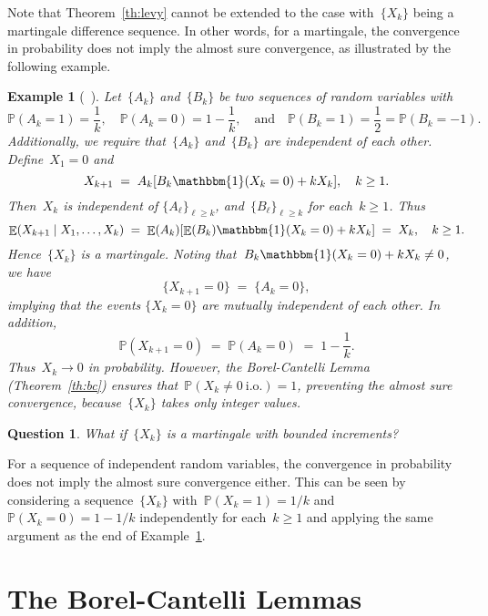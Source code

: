 \documentclass[12pt,a4paper]{article}  %
\newcounter{cite}
\newtheorem{example}{Example}[section]
\newtheorem{question}{Question}[section]
\theoremstyle{definition}
\numberwithin{equation}{section}
\newcommand{\ind}{\mathbbm{1}}
\newcommand{\io}{{\text{i.o.}}\xspace}
\newcommand{\iid}{{\text{i.i.d.}}\xspace}
\DeclareMathOperator{\expc}{\mathbb{E}}
\renewcommand{\Pr}{\mathbb{P}}
\begin{document}
Note that Theorem~\ref{th:levy} cannot be extended to the case with~$\{X_k\}$ being a martingale
difference sequence. In other words, for a martingale, the convergence in probability does not imply
the almost sure convergence, as illustrated by the following example.

\begin{example}[\mbox{~\cite[Example 4.2.14]{Durrett_2019}}]
    \label{exp:durret}
    Let~$\{A_k\}$ and~$\{B_k\}$ be two sequences of \iid random variables with
    \[
        \Pr(A_k = 1) = \frac{1}{k}, \quad \Pr(A_k = 0) = 1-\frac{1}{k},
        \quad \text{and} \quad
        \Pr(B_k=1) = \frac{1}{2} = \Pr(B_k = -1).
    \]
    Additionally, we require that~$\{A_k\}$ and~$\{B_k\}$ are independent of each other.
    Define~$X_1 = 0$ and
    \[
        X_{k+1} \;=\;  A_k[B_k \ind(X_k=0) + k X_k], \quad k \ge 1.
    \]
    Then~$X_k$ is independent of $\{A_\ell\}_{\ell \ge k}$, and~$\{B_\ell\}_{\ell\ge k}$  for
    each~$k\ge 1$. Thus
    \[
        \expc(X_{k+1} \mathrel{|} X_1, \ldots, X_k)
        \;=\;
        \expc(A_k) [\expc(B_k) \ind(X_k=0) + k X_k]
        \;=\; X_k, \quad k \ge 1.
    \]
    Hence~$\{X_k\}$ is a martingale. Noting that~$B_k \ind(X_k=0) + k X_k \neq 0$, we have
    \[
        \{X_{k+1} =0\} \;=\; \{A_k = 0\},
    \]
    implying that the events $\{X_k = 0\}$ are mutually
    independent of each other. In addition,
    \[
        \Pr(X_{k+1} = 0) \;=\; \Pr(A_k = 0) \;=\;  1-\frac{1}{k}.
    \]
    Thus~$X_k \to 0$ in probability. However, the Borel-Cantelli Lemma
    \textnormal{(}Theorem~\ref{th:bc}\textnormal{)}
    ensures that~$\Pr(X_k \neq 0~\io) = 1$, preventing the almost sure convergence,
    because~$\{X_k\}$ takes only integer values.
\end{example}

\begin{question}
    What if~$\{X_k\}$ is a martingale with bounded increments?
\end{question}

For a sequence of independent random variables, the convergence in probability does not imply
the  almost sure convergence either. This can be seen by considering a sequence~$\{X_k\}$ with~$\Pr(X_k = 1) = 1/k$
and~$\Pr(X_k = 0) = 1-1/k$ independently for each~$k\ge 1$ and applying the same argument as the
end of Example~\ref{exp:durret}.


\section{The Borel-Cantelli Lemmas}
\label{sec:bc}
\end{document}
